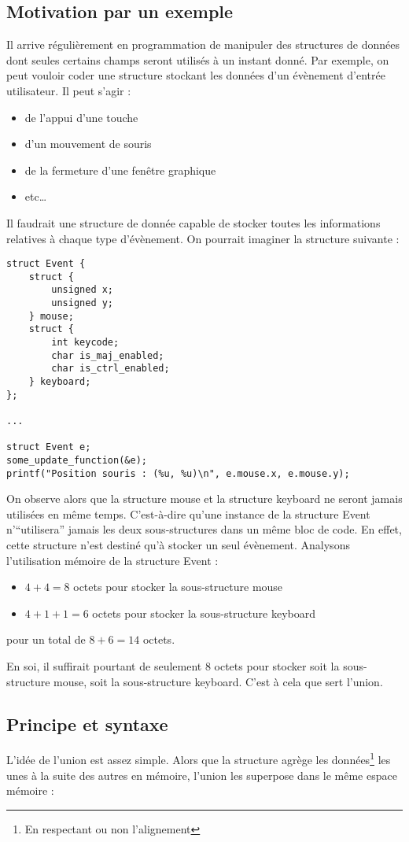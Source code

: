 \documentclass[../../../main.tex]{subfiles}
\begin{document}
\subsection{Motivation par un exemple}
Il arrive régulièrement en programmation de manipuler des structures de données dont seules certains
champs seront utilisés à un instant donné. Par exemple, on peut vouloir coder une structure stockant
les données d’un évènement d’entrée utilisateur. Il peut s’agir :
\begin{itemize}
	\item de l’appui d’une touche
	\item d’un mouvement de souris
	\item de la fermeture d’une fenêtre graphique
	\item etc\dots
\end{itemize}
Il faudrait une structure de donnée capable de stocker toutes les informations relatives à chaque type
d’évènement. On pourrait imaginer la structure suivante :
\begin{verbatim}
struct Event {
	struct {
		unsigned x;
		unsigned y;
	} mouse;
	struct {
		int keycode;
		char is_maj_enabled;
		char is_ctrl_enabled;
	} keyboard;
};

...

struct Event e;
some_update_function(&e);
printf("Position souris : (%u, %u)\n", e.mouse.x, e.mouse.y);
\end{verbatim}
On observe alors que la structure \textsf{mouse} et la structure \textsf{keyboard} ne seront jamais utilisées en même
temps. C’est-à-dire qu’une instance de la structure \textsf{Event} n’``utilisera'' jamais les deux sous-structures
dans un même bloc de code. En effet, cette structure n’est destiné qu’à stocker un seul évènement.
Analysons l’utilisation mémoire de la structure \textsf{Event} :
\begin{itemize}
	\item $4 + 4 = 8$ octets pour stocker la sous-structure \textsf{mouse}
	\item $4 + 1 + 1 = 6$ octets pour stocker la sous-structure \textsf{keyboard}
\end{itemize}
pour un total de $8 + 6 = 14$ octets.

En soi, il suffirait pourtant de seulement 8 octets pour stocker soit la sous-structure \textsf{mouse}, soit la
sous-structure \textsf{keyboard}. C’est à cela que sert l’union.
\subsection{Principe et syntaxe}
L’idée de l’union est assez simple. Alors que la structure agrège les données\footnote{En respectant ou non l’alignement} les unes à la suite des autres en mémoire, l’union les superpose dans le même espace mémoire :
\end{document}
